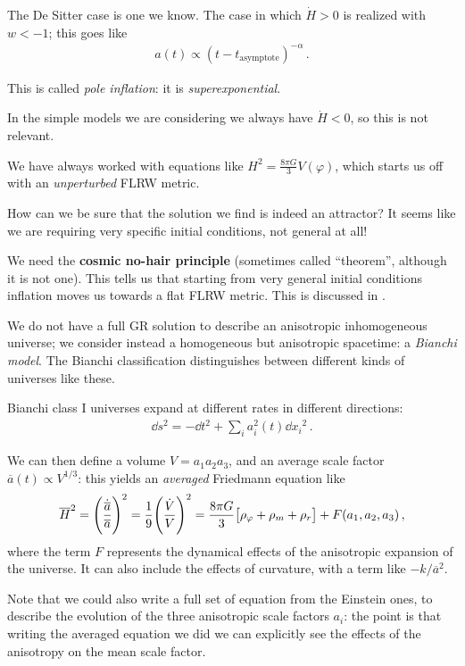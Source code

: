\documentclass[main.tex]{subfiles}
\begin{document}
The De Sitter case is one we know. 
The case in which \(\dot{H} >0\) is realized with \(w < -1\); this goes like 
%
\begin{align}
a(t ) \propto (t-t _{\text{asymptote}})^{-\alpha } 
\,.
\end{align}
%

This is called \emph{pole inflation}: it is \emph{superexponential}. 

In the simple models we are considering we always have \(\dot{H} < 0 \), so this is not relevant. 

We have always worked with equations like \(H^2 = \frac{8 \pi G}{3} V(\varphi )\), which starts us off with an \emph{unperturbed} FLRW metric.

How can we be sure that the solution we find is indeed an attractor? It seems like we are requiring very specific initial conditions, not general at all! 

We need the \textbf{cosmic no-hair principle} (sometimes called ``theorem'', although it is not one).
This tells us that starting from very general initial conditions inflation moves us towards a flat FLRW metric. 
This is discussed in \textcite[]{kolbEarlyUniverse1994}. 

We do not have a full GR solution to describe an anisotropic inhomogeneous universe; we consider instead a homogeneous but anisotropic spacetime: a \emph{Bianchi model}. 
The Bianchi classification distinguishes between different kinds of universes like these. 

Bianchi class I universes expand at different rates in different directions: 
%
\begin{align}
\dd{s^2} = - \dd{t}^2 + \sum _{i} a_i^2 (t) \dd{x_i}^2
\,.
\end{align}

We can then define a volume \(V = a_1 a_2 a_3 \), and an average scale factor \(\overline{a} (t) \propto V^{1/3}\): this yields an \emph{averaged} Friedmann equation like 
%
\begin{align}
\overline{H}^2 = \qty(\frac{\dot{\overline{a}}}{\overline{a}})^2 = \frac{1}{9} \qty(\frac{\dot{V}}{V})^2
 = \frac{8 \pi G}{3} \qty[\rho _\varphi + \rho _m + \rho _r]
 + F(a_1, a_2, a_3 )
\,,
\end{align}
%
where the term \(F\) represents the dynamical effects of the anisotropic expansion of the universe. 
It can also include the effects of curvature, with a term like \(- k / \overline{a}^2\).

Note that we could also write a full set of equation from the Einstein ones, to describe the evolution of the three anisotropic scale factors \(a_i\): the point is that writing the averaged equation we did we can explicitly see the effects of the anisotropy on the mean scale factor. 
\end{document}
